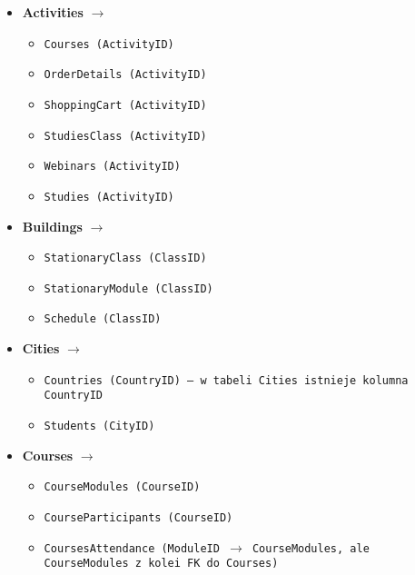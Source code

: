 \documentclass[12pt]{article}
\begin{document}
\begin{itemize}
    \item \textbf{Activities} \(\rightarrow\)
        \begin{itemize}
            \item \texttt{Courses (ActivityID)}
            \item \texttt{OrderDetails (ActivityID)}
            \item \texttt{ShoppingCart (ActivityID)}
            \item \texttt{StudiesClass (ActivityID)}
            \item \texttt{Webinars (ActivityID)}
            \item \texttt{Studies (ActivityID)}
        \end{itemize}
    \item \textbf{Buildings} \(\rightarrow\)
        \begin{itemize}
            \item \texttt{StationaryClass (ClassID)}
            \item \texttt{StationaryModule (ClassID)}
            \item \texttt{Schedule (ClassID)}
        \end{itemize}
    \item \textbf{Cities} \(\rightarrow\)
        \begin{itemize}
            \item \texttt{Countries (CountryID) -- w tabeli Cities istnieje kolumna CountryID}
            \item \texttt{Students (CityID)}
        \end{itemize}
    \item \textbf{Courses} \(\rightarrow\)
        \begin{itemize}
            \item \texttt{CourseModules (CourseID)}
            \item \texttt{CourseParticipants (CourseID)}
            \item \texttt{CoursesAttendance (ModuleID \(\rightarrow\) CourseModules, ale CourseModules z kolei FK do Courses)}
        \end{itemize}
        

\end{itemize}
\end{document}
